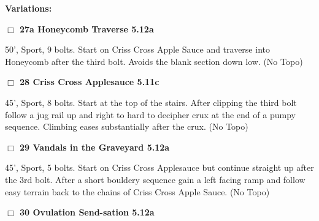 \begin{multicols}{2}
\begin{adjustwidth}{0.5cm}{}				
\needspace{4em}
\textbf{Variations:} \newline

\needspace{2em}
\label{vr:Honeycomb Traverse}
\colorbox{Goldenrod!20}{
\parbox{0.95\linewidth}{
\hspace{-1ex}\textbf{$\Box$
27a Honeycomb Traverse 5.12a  
}}}
\begin{adjustwidth}{1.3em}{}			

50', Sport, 9 bolts. Start on Criss Cross Apple Sauce and traverse into Honeycomb after the third bolt. Avoids the blank section down low.
  (No Topo)
\end{adjustwidth}



\end{adjustwidth}


\needspace{2em}
\label{rt:Criss Cross Applesauce}
\colorbox{RoyalBlue!20}{
\parbox{0.95\linewidth}{
\hspace{-1ex}\textbf{$\Box$
28 Criss Cross Applesauce 5.11c  
}}}
\begin{adjustwidth}{1.3em}{}			

45', Sport, 8 bolts. Start at the top of the stairs. After clipping the third bolt follow a jug rail up and right to hard to decipher crux at the end of a pumpy sequence. Climbing eases substantially after the crux.
  (No Topo)
\end{adjustwidth}




\needspace{2em}
\label{rt:Vandals in the Graveyard}
\colorbox{Goldenrod!20}{
\parbox{0.95\linewidth}{
\hspace{-1ex}\textbf{$\Box$
29 Vandals in the Graveyard 5.12a  
}}}
\begin{adjustwidth}{1.3em}{}			

45', Sport, 5 bolts. Start on Criss Cross Applesauce but continue straight up after the 3rd bolt. After a short bouldery sequence gain a left facing ramp and follow easy terrain back to the chains of Criss Cross Apple Sauce.
  (No Topo)
\end{adjustwidth}




\needspace{2em}
\label{rt:Ovulation Send-sation}
\colorbox{Goldenrod!20}{
\parbox{0.95\linewidth}{
\hspace{-1ex}\textbf{$\Box$
30 Ovulation Send-sation 5.12a  
}}}
\begin{adjustwidth}{1.3em}{}			


\end{adjustwidth}
\end{multicols}

